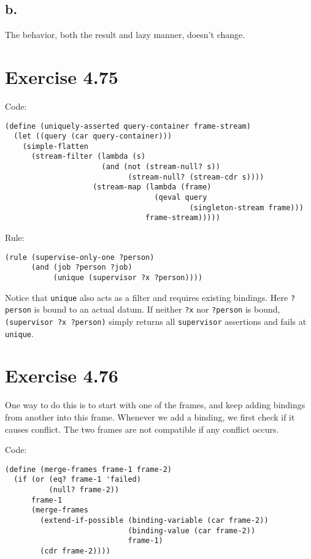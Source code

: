 \documentclass[../main.tex]{subfiles}
\begin{document}
\subsection{b.}

The behavior, both the result and lazy manner, doesn't change.

\section{Exercise 4.75}

Code:

\begin{lstlisting}
(define (uniquely-asserted query-container frame-stream)
  (let ((query (car query-container)))
    (simple-flatten
      (stream-filter (lambda (s)
                      (and (not (stream-null? s))
                            (stream-null? (stream-cdr s))))
                    (stream-map (lambda (frame)
                                  (qeval query
                                          (singleton-stream frame)))
                                frame-stream)))))
\end{lstlisting}

Rule:

\begin{lstlisting}
(rule (supervise-only-one ?person)
      (and (job ?person ?job)
           (unique (supervisor ?x ?person))))
\end{lstlisting}

Notice that \lstinline{unique} also acts as a filter and requires existing bindings. Here \lstinline{?person} is bound to an actual datum. If neither \lstinline{?x} nor \lstinline{?person} is bound, \lstinline{(supervisor ?x ?person)} simply returns all \lstinline{supervisor} assertions and fails at \lstinline{unique}. 

\section{Exercise 4.76}

One way to do this is to start with one of the frames, and keep adding bindings from another into this frame. Whenever we add a binding, we first check if it causes conflict. The two frames are not compatible if any conflict occurs.

Code:

\begin{lstlisting}
(define (merge-frames frame-1 frame-2)
  (if (or (eq? frame-1 'failed)
          (null? frame-2))
      frame-1
      (merge-frames
        (extend-if-possible (binding-variable (car frame-2))
                            (binding-value (car frame-2))
                            frame-1)
        (cdr frame-2))))
\end{lstlisting}
\end{document}
